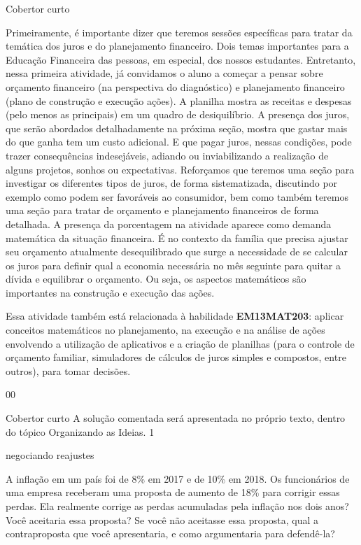 \begin{sugestions}{Cobertor curto}
{
Primeiramente, é importante dizer que teremos sessões específicas para tratar da temática dos juros e do planejamento financeiro. Dois temas importantes para a Educação Financeira das pessoas, em especial, dos nossos estudantes. Entretanto, nessa primeira atividade, já convidamos o aluno a começar a pensar sobre orçamento financeiro (na perspectiva do diagnóstico) e planejamento financeiro (plano de construção e execução ações). A planilha mostra as receitas e despesas (pelo menos as principais) em um quadro de desiquilíbrio. A presença dos juros, que serão abordados detalhadamente na próxima seção, mostra que gastar mais do que ganha tem um custo adicional. E que pagar juros, nessas condições, pode trazer consequências indesejáveis, adiando ou inviabilizando a realização de alguns projetos, sonhos ou expectativas. Reforçamos que teremos uma seção para investigar os diferentes tipos de juros, de forma sistematizada, discutindo por exemplo como podem ser favoráveis ao consumidor, bem como também teremos uma seção para tratar de orçamento e planejamento financeiros de forma detalhada. A presença da porcentagem na atividade aparece como demanda matemática da situação financeira. É no contexto da família que precisa ajustar seu orçamento atualmente desequilibrado que surge a necessidade de se calcular os juros para definir qual a economia necessária no mês seguinte para quitar a dívida e equilibrar o orçamento. Ou seja, os aspectos matemáticos são importantes na construção e execução das ações. 

Essa atividade também está relacionada à habilidade \textbf{EM13MAT203}: aplicar conceitos matemáticos no planejamento, na execução e na análise de ações envolvendo a utilização de aplicativos e a criação de planilhas (para o controle de orçamento familiar, simuladores de cálculos de juros simples e compostos, entre outros), para tomar decisões.
}{0}{0}
\end{sugestions}
\marginpar{\vspace{.5em}}
\begin{answer}{Cobertor curto}
{
A solução comentada será apresentada no próprio texto, dentro do tópico Organizando as Ideias.
}{1}
\end{answer}
\begin{task}{negociando reajustes}
\label{fin-ativ-1}

A inflação em um país foi de 8\% em 2017 e de 10\% em 2018. Os funcionários de uma empresa receberam uma proposta de aumento de 18\% para corrigir essas perdas. Ela realmente corrige as perdas acumuladas pela inflação nos dois anos? Você aceitaria essa proposta? Se você não aceitasse essa proposta, qual a contraproposta que você apresentaria, e como argumentaria para defendê-la?
\end{task}

